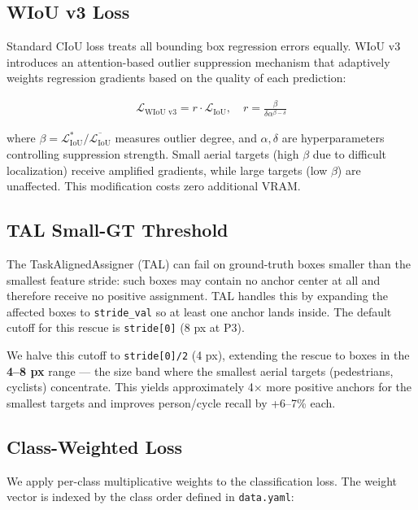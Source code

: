 \documentclass[11pt]{article}
\begin{document}
\subsection{WIoU v3 Loss}

Standard CIoU loss treats all bounding box regression errors equally. WIoU v3 \cite{tong2023wise}
introduces an attention-based outlier suppression mechanism that adaptively weights regression
gradients based on the quality of each prediction:

\begin{align}
    \mathcal{L}_{\text{WIoU v3}} = r \cdot \mathcal{L}_{\text{IoU}},
    \quad r = \frac{\beta}{\delta \alpha^{\beta - \delta}}
\end{align}

where $\beta = \mathcal{L}_{\text{IoU}}^* / \overline{\mathcal{L}_{\text{IoU}}}$ measures
outlier degree, and $\alpha, \delta$ are hyperparameters controlling suppression strength.
Small aerial targets (high $\beta$ due to difficult localization) receive amplified gradients,
while large targets (low $\beta$) are unaffected. This modification costs zero additional VRAM.

\subsection{TAL Small-GT Threshold}

The TaskAlignedAssigner (TAL) \cite{feng2021toad} can fail on ground-truth boxes smaller than
the smallest feature stride: such boxes may contain no anchor center at all and therefore
receive no positive assignment. TAL handles this by expanding the affected boxes to
\texttt{stride\_val} so at least one anchor lands inside. The default cutoff for this rescue
is \texttt{stride[0]} (8 px at P3).

We halve this cutoff to \texttt{stride[0]/2} (4 px), extending the rescue to boxes in the
\textbf{4--8 px} range — the size band where the smallest aerial targets (pedestrians, cyclists)
concentrate. This yields approximately 4$\times$ more positive anchors for the smallest targets
and improves person/cycle recall by +6--7\% each.

\subsection{Class-Weighted Loss}

We apply per-class multiplicative weights to the classification loss. The weight vector is
indexed by the class order defined in \texttt{data.yaml}:
\end{document}
